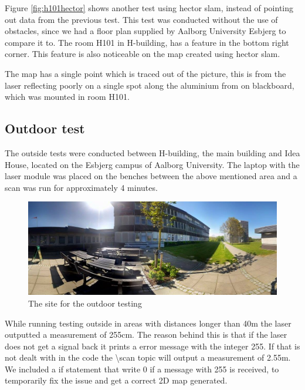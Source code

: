 Figure \ref{fig:h101hector} shows another test using hector slam, instead of pointing out data from the previous test. This test was conducted without the use of obstacles, since we had a floor plan supplied by Aalborg University Esbjerg to compare it to. The room H101 in H-building, has a feature in the bottom right corner. This feature is also noticeable on the map created using hector slam.

The map has a single point which is traced out of the picture, this is from the laser reflecting poorly on a single spot along the aluminium from on blackboard, which was mounted in room H101.

\subsection{Outdoor test}
The outside tests were conducted between H-building, the main building and Idea House, located on the Esbjerg campus of Aalborg University. The laptop with the laser module was placed on the benches between the above mentioned area and a scan was run for approximately 4 minutes.

\begin{figure}[H]
	\centering
	\includegraphics[width=1\linewidth]{images/lidar_outside_site.jpg}
	\caption{The site for the outdoor testing}
	\label{fig:outsideslam}
\end{figure}

While running testing outside in areas with distances longer than 40m the laser outputted a measurement of 255cm. The reason behind this is that if the laser does not get a signal back it prints a error message with the integer 255. If that is not dealt with in the code the \textbackslash scan topic will output a measurement of 2.55m. We included a if statement that write 0 if a message with 255 is received, to temporarily fix the issue and get a correct 2D map generated. 

